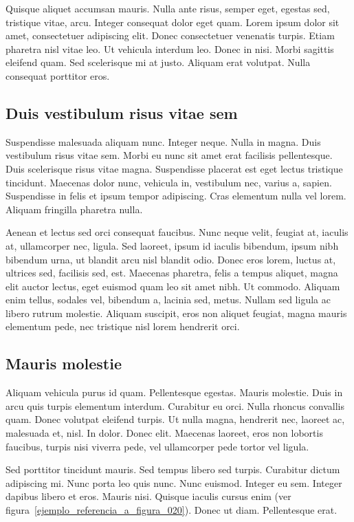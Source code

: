 Quisque aliquet accumsan mauris. Nulla ante risus, semper eget, egestas sed, tristique vitae, arcu. Integer consequat dolor eget quam. Lorem ipsum dolor sit amet, consectetuer adipiscing elit. Donec consectetuer venenatis turpis. Etiam pharetra nisl vitae leo. Ut vehicula interdum leo. Donec in nisi. Morbi sagittis eleifend quam. Sed scelerisque mi at justo. Aliquam erat volutpat. Nulla consequat porttitor eros.


\subsection*{Duis vestibulum risus vitae sem}
Suspendisse malesuada aliquam nunc. Integer neque. Nulla in magna. Duis vestibulum risus vitae sem. Morbi eu nunc sit amet erat facilisis pellentesque. Duis scelerisque risus vitae magna. Suspendisse placerat est eget lectus tristique tincidunt. Maecenas dolor nunc, vehicula in, vestibulum nec, varius a, sapien. Suspendisse in felis et ipsum tempor adipiscing. Cras elementum nulla vel lorem. Aliquam fringilla pharetra nulla. 

Aenean et lectus sed orci consequat faucibus. Nunc neque velit, feugiat at, iaculis at, ullamcorper nec, ligula. Sed laoreet, ipsum id iaculis bibendum, ipsum nibh bibendum urna, ut blandit arcu nisl blandit odio. Donec eros lorem, luctus at, ultrices sed, facilisis sed, est. Maecenas pharetra, felis a tempus aliquet, magna elit auctor lectus, eget euismod quam leo sit amet nibh. Ut commodo. Aliquam enim tellus, sodales vel, bibendum a, lacinia sed, metus. Nullam sed ligula ac libero rutrum molestie. Aliquam suscipit, eros non aliquet feugiat, magna mauris elementum pede, nec tristique nisl lorem hendrerit orci.


\subsection*{Mauris molestie}
Aliquam vehicula purus id quam. Pellentesque egestas. Mauris molestie. Duis in arcu quis turpis elementum interdum. Curabitur eu orci. Nulla rhoncus convallis quam. Donec volutpat eleifend turpis. Ut nulla magna, hendrerit nec, laoreet ac, malesuada et, nisl. In dolor. Donec elit. Maecenas laoreet, eros non lobortis faucibus, turpis nisi viverra pede, vel ullamcorper pede tortor vel ligula.

Sed porttitor tincidunt mauris. Sed tempus libero sed turpis. Curabitur dictum adipiscing mi. Nunc porta leo quis nunc. Nunc euismod. Integer eu sem. Integer dapibus libero et eros. Mauris nisi. Quisque iaculis cursus enim (ver figura~\ref{ejemplo_referencia_a_figura_020}). Donec ut diam. Pellentesque erat.


